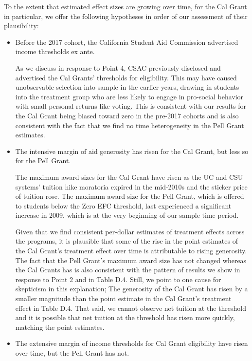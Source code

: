 \documentclass[12pt,letterpaper,oneside]{book}
\begin{document}
To the extent that estimated effect sizes are growing over time, for the Cal Grant in particular, we offer the following hypotheses in order of our assessment of their plausibility:
\begin{itemize}
    \item[A)] Before the 2017 cohort, the California Student Aid Commission advertised income thresholds ex ante.

    As we discuss in response to Point 4, CSAC previously disclosed and advertised the Cal Grants' thresholds for eligibility. This may have caused unobservable selection into sample in the earlier years, drawing in students into the treatment group who are less likely to engage in pro-social behavior with small personal returns like voting. This is consistent with our results for the Cal Grant being biased toward zero in the pre-2017 cohorts and is also consistent with the fact that we find no time heterogeneity in the Pell Grant estimates.

    \item[B)] The intensive margin of aid generosity has risen for the Cal Grant, but less so for the Pell Grant.

The maximum award sizes for the Cal Grant have risen as the UC and CSU systems' tuition hike moratoria expired in the mid-2010s and the sticker price of tuition rose. The maximum award size for the Pell Grant, which is offered to students below the Zero EFC threshold, last experienced a significant increase in 2009, which is at the very beginning of our sample time period.

Given that we find consistent per-dollar estimates of treatment effects across the programs, it is plausible that some of the rise in the point estimates of the Cal Grant's treatment effect over time is attributable to rising generosity. The fact that the Pell Grant's maximum award size has not changed whereas the Cal Grants has is also consistent with the pattern of results we show in response to Point 2 and in Table D.4. Still, we point to one cause for skepticism in this explanation; The generosity of the Cal Grant has risen by a smaller magnitude than the point estimate in the Cal Grant’s treatment effect in Table D.4. That said, we cannot observe net tuition at the threshold and it is possible that net tuition at the threshold has risen more quickly, matching the point estimates.

    \item[C)] The extensive margin of income thresholds for Cal Grant eligibility have risen over time, but the Pell Grant has not.


\end{itemize}
\end{document}
